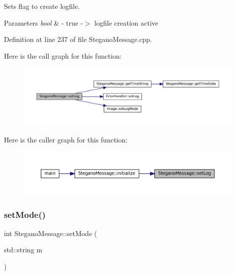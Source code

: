 Sets flag to create logfile. 


\begin{DoxyParams}{Parameters}
{\em bool} & -\/ true -\/$>$ logfile creation active \\
\hline
\end{DoxyParams}


Definition at line 237 of file Stegano\+Message.\+cpp.

Here is the call graph for this function\+:
\nopagebreak
\begin{figure}[H]
\begin{center}
\leavevmode
\includegraphics[width=350pt]{classSteganoMessage_a438e9d5189a8e3b83021fada4a6a469c_cgraph}
\end{center}
\end{figure}
Here is the caller graph for this function\+:
\nopagebreak
\begin{figure}[H]
\begin{center}
\leavevmode
\includegraphics[width=350pt]{classSteganoMessage_a438e9d5189a8e3b83021fada4a6a469c_icgraph}
\end{center}
\end{figure}
\mbox{\label{classSteganoMessage_a3e06a73baa5744b5eb9152f4ae65f458}} 
\subsubsection{\texorpdfstring{setMode()}{setMode()}}
{\footnotesize\ttfamily int Stegano\+Message\+::set\+Mode (\begin{DoxyParamCaption}\item[{std\+::string}]{m }\end{DoxyParamCaption})}



